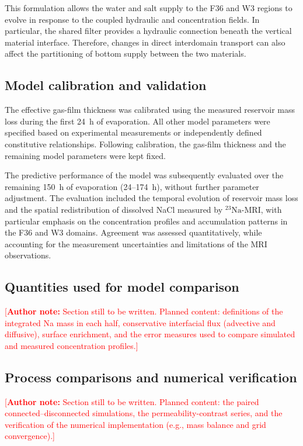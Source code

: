 \documentclass[final]{agujournal2019}
\newcommand{\authornote}[1]{%
  \par\noindent\textcolor{red}{\small[\textbf{Author note:} #1]}\par}
\newcommand{\NaIso}{\ensuremath{^{23}\mathrm{Na}}}
\begin{document}
This formulation allows the water and salt supply to the F36 and W3 regions to
evolve in response to the coupled hydraulic and concentration fields. In
particular, the shared filter provides a hydraulic connection beneath the
vertical material interface. Therefore, changes in direct interdomain transport
can also affect the partitioning of bottom supply between the two materials.

\subsection{Model calibration and validation} \label{sec:model-calibration}

The effective gas-film thickness was calibrated using the measured reservoir
mass loss during the first 24~h of evaporation. All other model parameters were
specified based on experimental measurements or independently defined
constitutive relationships. Following calibration, the gas-film thickness and
the remaining model parameters were kept fixed.

The predictive performance of the model was subsequently evaluated over the
remaining 150~h of evaporation (24--174~h), without further parameter
adjustment. The evaluation included the temporal evolution of reservoir mass
loss and the spatial redistribution of dissolved NaCl measured by \NaIso-MRI,
with particular emphasis on the concentration profiles and accumulation
patterns in the F36 and W3 domains. Agreement was assessed quantitatively, while
accounting for the measurement uncertainties and limitations of the MRI
observations.

\subsection{Quantities used for model comparison} \label{sec:quantities}

\authornote{Section still to be written. Planned content: definitions of the
integrated Na mass in each half, conservative interfacial flux (advective and
diffusive), surface enrichment, and the error measures used to compare simulated
and measured concentration profiles.}

\subsection{Process comparisons and numerical verification} \label{sec:process-comparison}

\authornote{Section still to be written. Planned content: the paired
connected--disconnected simulations, the permeability-contrast series, and the
verification of the numerical implementation (e.g., mass balance and grid
convergence).}
\end{document}
